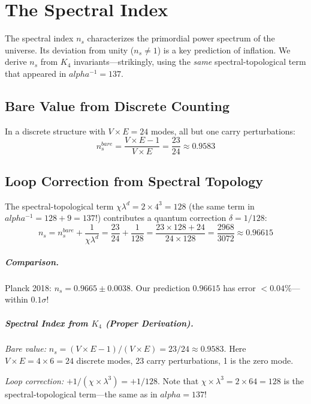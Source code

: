 \documentclass[11pt,a4paper]{book}
\def\alpha{alpha}%
\def\text#1{#1}%
\begin{document}
\chapter{The Spectral Index}
\label{chap:spectral-index}

The spectral index $n_s$ characterizes the primordial power spectrum of the universe. 
Its deviation from unity ($n_s \neq 1$) is a key prediction of inflation. We derive 
$n_s$ from $K_4$ invariants—strikingly, using the \emph{same} spectral-topological 
term that appeared in $\alpha^{-1} = 137$.

\section{Bare Value from Discrete Counting}

In a discrete structure with $V \times E = 24$ modes, all but one carry perturbations:
\[
n_s^{\text{bare}} = \frac{V \times E - 1}{V \times E} = \frac{23}{24} \approx 0.9583
\]

\section{Loop Correction from Spectral Topology}

The spectral-topological term $\chi \lambda^d = 2 \times 4^3 = 128$ (the same term 
in $\alpha^{-1} = 128 + 9 = 137$!) contributes a quantum correction $\delta = 1/128$:
\[
n_s = n_s^{\text{bare}} + \frac{1}{\chi \lambda^d} = \frac{23}{24} + \frac{1}{128}
    = \frac{23 \times 128 + 24}{24 \times 128} = \frac{2968}{3072} \approx 0.96615
\]

\paragraph{Comparison.} Planck 2018: $n_s = 0.9665 \pm 0.0038$. 
Our prediction $0.96615$ has error $< 0.04\%$—within $0.1\sigma$!

\paragraph{Spectral Index from $K_4$ (Proper Derivation).}
\emph{Bare value:} $n_s = (V \times E - 1)/(V \times E) = 23/24 \approx 0.9583$.
Here $V \times E = 4 \times 6 = 24$ discrete modes, 23 carry perturbations, 1 is the zero mode.

\emph{Loop correction:} $+1/(\chi \times \lambda^3) = +1/128$.
Note that $\chi \times \lambda^3 = 2 \times 64 = 128$ is the spectral-topological term---the same as in $\alpha = 137$!
\end{document}
